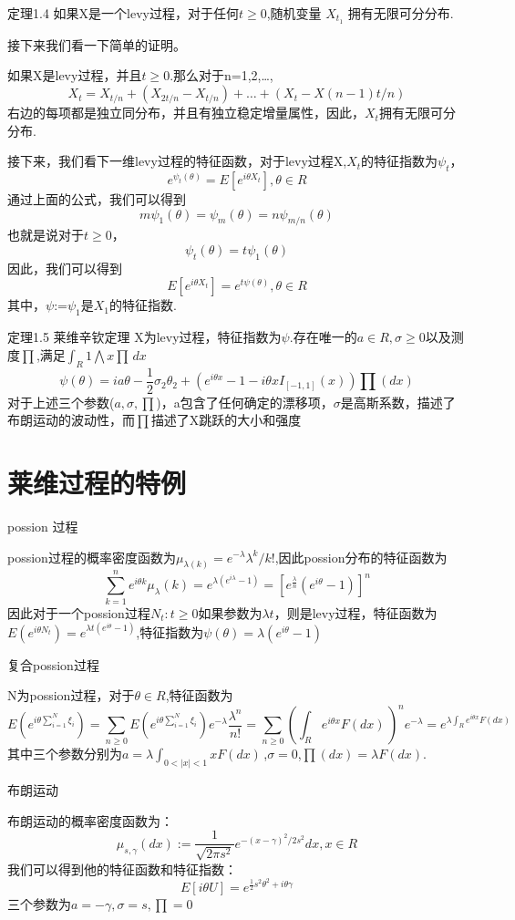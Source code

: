 \documentclass{ctexart} %
\begin{document}
定理1.4 如果X是一个levy过程，对于任何$t \geq 0$,随机变量 $X_{t_1} $ 拥有无限可分分布.

接下来我们看一下简单的证明。

如果X是levy过程，并且$t \geq 0$.那么对于n=1,2,\dots,\[ X_{t}=X_{t/n}+(X_{2t/n}-X_{t/n})+\dots+(X_{t}-X{(n-1)t/n})\]右边的每项都是独立同分布，并且有独立稳定增量属性，因此，${X_{t}}$拥有无限可分分布.

接下来，我们看下一维levy过程的特征函数，对于levy过程X,$X_{t}$的特征指数为$\psi_{t}$，\[e^{\psi_{t}(\theta)}=E[e^{i \theta X_{t}}] ,\theta \in R \]通过上面的公式，我们可以得到\[ m\psi_{1}(\theta)=\psi_{m}(\theta)=n\psi_{m/n}(\theta)\] 也就是说对于$t \geq 0$，\[\psi_{t}(\theta)=t\psi_{1}(\theta)\]因此，我们可以得到\[E[e^{i\theta X_{t}}]=e^{t\psi(\theta)}, \theta \in R\]其中，$\psi$:=$\psi_{1}$是$X_{1}$的特征指数.

定理1.5 莱维辛钦定理  X为levy过程，特征指数为$\psi$.存在唯一的$a \in R,\sigma \geq 0$以及测度$\prod$,满足$\int_R 1 \bigwedge x \prod \,dx$  \[\psi(\theta)=ia\theta-\frac{1}{2}\sigma_{2}\theta_{2}+(e^{i\theta x}-1-i\theta xI_{[-1,1]}(x))\prod(dx)\]对于上述三个参数($a,\sigma,\prod$)，a包含了任何确定的漂移项，$\sigma$是高斯系数，描述了布朗运动的波动性，而$\prod$描述了X跳跃的大小和强度

\section{莱维过程的特例}
possion 过程  

possion过程的概率密度函数为$\mu_{\lambda({k})}=e^{-\lambda}\lambda^{k}/k!$,因此possion分布的特征函数为\[\sum_{k=1}^{n}e^{i\theta k}\mu_{\lambda}({k})=e^{\lambda(e^{i\lambda}-1)}=[e^{\frac{\lambda}{n}}(e^{i\theta}-1)]^{n} \]因此对于一个possion过程{$N_{t}:t \geq 0$}如果参数为$\lambda t$，则是levy过程，特征函数为$E(e^{i\theta N_{t}})=e^{\lambda t(e^{i\theta}-1)}$,特征指数为$\psi(\theta)=\lambda(e^{i\theta}-1)$

复合possion过程

  N为possion过程，对于$\theta \in R $,特征函数为\[E(e^{i\theta\sum_{i=1}^{N}\xi_{i}})=\sum_{n\geq0}E(e^{i\theta\sum_{i=1}^{N}\xi_{i}})e^{-\lambda}\frac{\lambda^{n}}{n!}
  =\sum_{n\geq0}(\int_R e^{i\theta x}F(dx)\,)^{n}e^{-\lambda}=e^{\lambda\int_R e^{i\theta x}F(dx)\,} \]其中三个参数分别为$a=\lambda\int_{0<|x|<1}xF(dx) \,$,$\sigma=0$,$\prod(dx)=\lambda F(dx)$.

布朗运动

布朗运动的概率密度函数为：\[\mu_{s,\gamma}(dx):=\frac{1}{\sqrt{2\pi s^{2}}}e^{-(x-\gamma)^{2}/2s^{2}}dx ,x \in R\]我们可以得到他的特征函数和特征指数：\[E[i\theta U]=e^{\frac{1}{2}s^{2}\theta^{2}+i\theta\gamma}\]三个参数为$a=-\gamma,\sigma=s,\prod=0$
\end{document}
